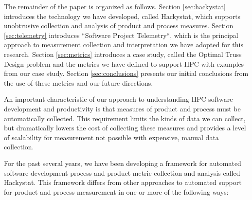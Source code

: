 \documentclass[times,10pt,twocolumn]{article}
\begin{document}
The remainder of the paper is organized as follows.  Section
\ref{sec:hackystat} introduces the technology we have developed, called
Hackystat, which supports unobtrusive collection and analysis of product
and process measures. Section \ref{sec:telemetry} introduces ``Software
Project Telemetry``, which is the principal approach to measurement
collection and interpretation we have adopted for this research.  Section
\ref{sec:metrics} introduces a case study, called the Optimal
Truss Design problem \cite{Gustafson04} and the metrics we have
defined to support HPC with examples from our case study.  Section
\ref{sec:conclusions} presents our initial conclusions from the use of
these metrics and our future directions.

\label{sec:hackystat}

An important characteristic of our approach to understanding HPC
software development and productivity is that measures of product and
process must be automatically collected.  This requirement limits the
kinds of data we can collect, but dramatically lowers the cost of
collecting these measures and provides a level of scalability for
measurement not possible with expensive, manual data collection.

For the past several years, we have been developing a framework for
automated software development process and product metric collection
and analysis called Hackystat.  This framework differs from other
approaches to automated support for product and process measurement in
one or more of the following ways:
\end{document}
